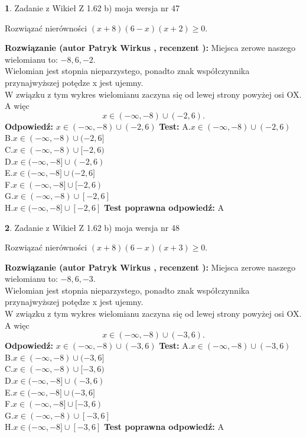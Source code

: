 \documentclass[12pt, a4paper]{article}
\theoremstyle{definition} %
\newtheorem{zad}{}
\newcommand{\zadStart}[1]{\begin{zad}#1\newline}
\newcommand{\zadStop}{\end{zad}}
\newcommand{\rozwStart}[2]{\noindent \textbf{Rozwiązanie (autor #1 , recenzent #2): }\newline}
\newcommand{\rozwStop}{\newline}
\newcommand{\odpStart}{\noindent \textbf{Odpowiedź:}\newline}
\newcommand{\odpStop}{\newline}
\newcommand{\testStart}{\noindent \textbf{Test:}\newline}
\newcommand{\testStop}{\newline}
\newcommand{\kluczStart}{\noindent \textbf{Test poprawna odpowiedź:}\newline}
\newcommand{\kluczStop}{\newline}
\begin{document}
\zadStart{Zadanie z Wikieł Z 1.62 b) moja wersja nr 47}

Rozwiązać nierówności $(x+8)(6-x)(x+2)\ge0$.
\zadStop
\rozwStart{Patryk Wirkus}{}
Miejsca zerowe naszego wielomianu to: $-8, 6, -2$.\\
Wielomian jest stopnia nieparzystego, ponadto znak współczynnika przy\linebreak najwyższej potędze x jest ujemny.\\ W związku z tym wykres wielomianu zaczyna się od lewej strony powyżej osi OX. A więc $$x \in (-\infty,-8) \cup (-2,6).$$
\rozwStop
\odpStart
$x \in (-\infty,-8) \cup (-2,6)$
\odpStop
\testStart
A.$x \in (-\infty,-8) \cup (-2,6)$\\
B.$x \in (-\infty,-8) \cup (-2,6]$\\
C.$x \in (-\infty,-8) \cup [-2,6)$\\
D.$x \in (-\infty,-8] \cup (-2,6)$\\
E.$x \in (-\infty,-8] \cup (-2,6]$\\
F.$x \in (-\infty,-8] \cup [-2,6)$\\
G.$x \in (-\infty,-8) \cup [-2,6]$\\
H.$x \in (-\infty,-8] \cup [-2,6]$
\testStop
\kluczStart
A
\kluczStop



\zadStart{Zadanie z Wikieł Z 1.62 b) moja wersja nr 48}

Rozwiązać nierówności $(x+8)(6-x)(x+3)\ge0$.
\zadStop
\rozwStart{Patryk Wirkus}{}
Miejsca zerowe naszego wielomianu to: $-8, 6, -3$.\\
Wielomian jest stopnia nieparzystego, ponadto znak współczynnika przy\linebreak najwyższej potędze x jest ujemny.\\ W związku z tym wykres wielomianu zaczyna się od lewej strony powyżej osi OX. A więc $$x \in (-\infty,-8) \cup (-3,6).$$
\rozwStop
\odpStart
$x \in (-\infty,-8) \cup (-3,6)$
\odpStop
\testStart
A.$x \in (-\infty,-8) \cup (-3,6)$\\
B.$x \in (-\infty,-8) \cup (-3,6]$\\
C.$x \in (-\infty,-8) \cup [-3,6)$\\
D.$x \in (-\infty,-8] \cup (-3,6)$\\
E.$x \in (-\infty,-8] \cup (-3,6]$\\
F.$x \in (-\infty,-8] \cup [-3,6)$\\
G.$x \in (-\infty,-8) \cup [-3,6]$\\
H.$x \in (-\infty,-8] \cup [-3,6]$
\testStop
\kluczStart
A
\kluczStop
\end{document}
